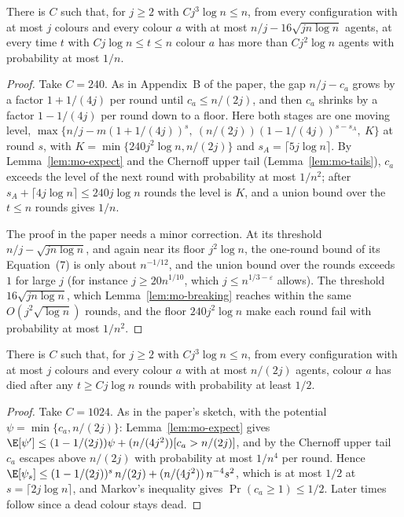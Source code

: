 \begin{lemma}\label{lem:mo-stage1}
\leanok
{}
There is $C$ such that, for $j\ge2$ with $Cj^3\log n\le n$, from every configuration with at most
$j$ colours and every colour $a$ with at most $n/j-16\sqrt{jn\log n}$ agents, at every time $t$
with $Cj\log n\le t\le n$ colour $a$ has more than $Cj^2\log n$ agents with probability at most
$1/n$.
\end{lemma}
\begin{proof}\leanok
Take $C=240$. As in Appendix~B of the paper, the gap $n/j-c_a$ grows by a factor $1+1/(4j)$ per
round until $c_a\le n/(2j)$, and then $c_a$ shrinks by a factor $1-1/(4j)$ per round down to a
floor. Here both stages are one moving level,
$\max\{n/j-m(1+1/(4j))^s,\ (n/(2j))(1-1/(4j))^{s-s_A},\ K\}$ at round $s$, with
$K=\min\{240j^2\log n,n/(2j)\}$ and $s_A=\lceil5j\log n\rceil$. By Lemma~\ref{lem:mo-expect} and
the Chernoff upper tail (Lemma~\ref{lem:mo-tails}), $c_a$ exceeds the level of the next round
with probability at most $1/n^2$; after $s_A+\lceil4j\log n\rceil\le240j\log n$ rounds the level
is $K$, and a union bound over the $t\le n$ rounds gives $1/n$.

The proof in the paper needs a minor correction. At its threshold $n/j-\sqrt{jn\log n}$, and
again near its floor $j^2\log n$, the one-round bound of its Equation~(7) is only about
$n^{-1/12}$, and the union bound over the rounds exceeds $1$ for large $j$ (for instance
$j\ge20n^{1/10}$, which $j\le n^{1/3-\varepsilon}$ allows). The threshold $16\sqrt{jn\log n}$,
which Lemma~\ref{lem:mo-breaking} reaches within the same $O(j^2\sqrt{\log n})$ rounds, and the
floor $240j^2\log n$ make each round fail with probability at most $1/n^2$.
\end{proof}

\begin{lemma}\label{lem:mo-stage2}
\leanok
{}
There is $C$ such that, for $j\ge2$ with $Cj^3\log n\le n$, from every configuration with at most
$j$ colours and every colour $a$ with at most $n/(2j)$ agents, colour $a$ has died after any
$t\ge Cj\log n$ rounds with probability at least $1/2$.
\end{lemma}
\begin{proof}\leanok
Take $C=1024$. As in the paper's sketch, with the potential $\psi=\min\{c_a,n/(2j)\}$:
Lemma~\ref{lem:mo-expect} gives $\E[\psi']\le(1-1/(2j))\psi+(n/(4j^2))[c_a>n/(2j)]$, and by the
Chernoff upper tail $c_a$ escapes above $n/(2j)$ with probability at most $1/n^4$ per round.
Hence $\E[\psi_s]\le(1-1/(2j))^s\,n/(2j)+(n/(4j^2))\,n^{-4}s^2$, which is at most $1/2$ at
$s=\lceil2j\log n\rceil$, and Markov's inequality gives $\Pr(c_a\ge1)\le1/2$. Later times follow
since a dead colour stays dead.
\end{proof}

